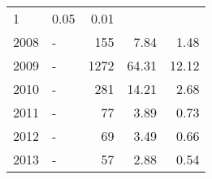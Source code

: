 \begin{longtable}{lXrrr}
       \num{1} &
       \num[round-mode=places,round-precision=2]{0,05} &
         \num[round-mode=places,round-precision=2]{0,01} \\

     2008 &
     \multicolumn{1}{X}{ -  } &


       \num{155} &
       \num[round-mode=places,round-precision=2]{7,84} &
         \num[round-mode=places,round-precision=2]{1,48} \\

     2009 &
     \multicolumn{1}{X}{ -  } &


       \num{1272} &
       \num[round-mode=places,round-precision=2]{64,31} &
         \num[round-mode=places,round-precision=2]{12,12} \\

     2010 &
     \multicolumn{1}{X}{ -  } &


       \num{281} &
       \num[round-mode=places,round-precision=2]{14,21} &
         \num[round-mode=places,round-precision=2]{2,68} \\

     2011 &
     \multicolumn{1}{X}{ -  } &


       \num{77} &
       \num[round-mode=places,round-precision=2]{3,89} &
         \num[round-mode=places,round-precision=2]{0,73} \\

     2012 &
     \multicolumn{1}{X}{ -  } &


       \num{69} &
       \num[round-mode=places,round-precision=2]{3,49} &
         \num[round-mode=places,round-precision=2]{0,66} \\

     2013 &
     \multicolumn{1}{X}{ -  } &


       \num{57} &
       \num[round-mode=places,round-precision=2]{2,88} &
         \num[round-mode=places,round-precision=2]{0,54} \\


\end{longtable}
